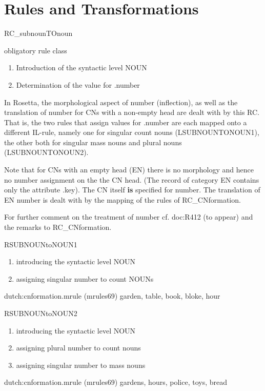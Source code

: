 \section{Rules and Transformations}
\begin{mruleclass}{RC\_subnounTOnoun}
\begin{classdescr}
\kind obligatory rule class
\classtask
\begin{enumerate}
  \item 
Introduction of the syntactic level NOUN
  \item
Determination of the value for .number
\end{enumerate}
\classremarks
In Rosetta, the morphological aspect of number (inflection),
as well as the translation
of number for CNs with a non-empty head
are dealt with by this RC.
That is, the two rules that assign values for .number 
are each mapped onto  a different IL-rule, 
namely one 
for singular count nouns (LSUBNOUNTONOUN1), the other both for singular
mass nouns and plural nouns  (LSUBNOUNTONOUN2).

Note that for CNs with an empty head (EN)
there is no morphology and hence no number assignment 
on the the CN head. (The record of category EN contains only the attribute 
.key). The CN itself {\bf is} 
specified for number. The translation
of EN number is dealt with by the mapping of the rules of RC\_CNformation. 

For further comment on the treatment of number cf. doc:R412 (to appear)
and the remarks to RC\_CNformation.
\nofilters
\nospeedrules

\noplannedrules

\norulesnotince


\end{classdescr}

\begin{members}
\begin{member}
 RSUBNOUNtoNOUN1
 \begin{enumerate}
  \item 
introducing the syntactic level NOUN
  \item
assigning singular number to 
count NOUNs
\end{enumerate}
\file dutch:cnformation.mrule (mrules69)
\semantics \nosemantics
\example garden, table, book, bloke, hour
\remarks\mbox{}

\end{member}
\begin{member}
 RSUBNOUNtoNOUN2
 \mbox{}\\
\begin{enumerate} 
\item introducing the syntactic level NOUN
\item
assigning plural number to count nouns 
\item assigning singular number to mass nouns 
\end{enumerate}
\file dutch:cnformation.mrule (mrules69)
\semantics \nosemantics
\example gardens, hours, police,  toys, bread
\remarks\mbox{}
\end{member}
\end{members}
\end{mruleclass}
